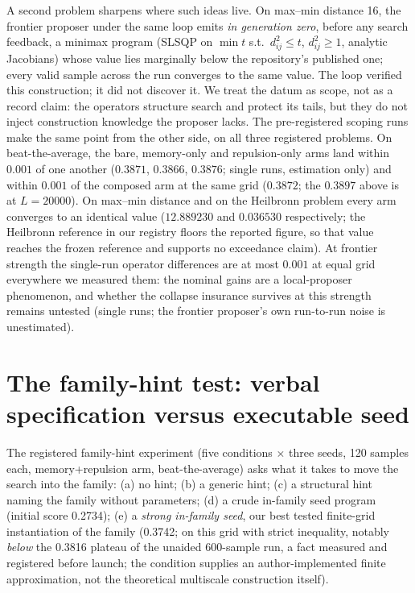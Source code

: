 \documentclass[11pt]{article}
\begin{document}
A second problem sharpens where such ideas live. On max--min distance 16,
the frontier proposer under the same loop emits \emph{in generation
zero}, before any search feedback, a minimax program (SLSQP on
$\min t$ s.t.\ $d^2_{ij}\le t$, $d^2_{ij}\ge 1$, analytic Jacobians)
whose value lies marginally below the repository's published one; every
valid sample across the run converges to the same value. The loop
verified this construction; it did not discover it. We treat the datum as
scope, not as a record claim: the operators structure search and protect
its tails, but they do not inject construction knowledge the proposer
lacks. The pre-registered scoping runs make the same point from the
other side, on all three registered problems. On beat-the-average, the
bare, memory-only and repulsion-only arms land within $0.001$ of one
another ($0.3871$, $0.3866$, $0.3876$; single runs, estimation only) and
within $0.001$ of the composed arm at the same grid ($0.3872$; the
$0.3897$ above is at $L{=}20000$). On max--min distance and
on the Heilbronn problem every arm converges to an identical value
($12.889230$ and $0.036530$ respectively; the Heilbronn reference in our
registry floors the reported figure, so that value reaches the frozen
reference and supports no exceedance claim). At frontier strength the
single-run operator differences are at most $0.001$ at equal grid
everywhere we measured them: the nominal gains are a local-proposer phenomenon,
and whether the collapse insurance survives at this strength remains
untested (single runs; the frontier proposer's own run-to-run noise is
unestimated).

\section{The family-hint test: verbal specification versus executable seed}
\label{sec:hint}

The registered family-hint experiment (five conditions $\times$ three
seeds, 120 samples each, memory+repulsion arm, beat-the-average) asks
what it takes to move the search into the \citet{bellec2024beat}
family: (a) no hint; (b) a generic hint; (c) a structural hint naming
the family without parameters; (d) a crude in-family seed program
(initial score 0.2734); (e) a \emph{strong in-family seed}, our best
tested finite-grid instantiation of the family (0.3742; on this grid
with strict inequality, notably \emph{below} the 0.3816 plateau of the
unaided 600-sample run, a fact measured and registered before launch;
the condition supplies an author-implemented finite approximation, not
the theoretical multiscale construction itself).
\end{document}
